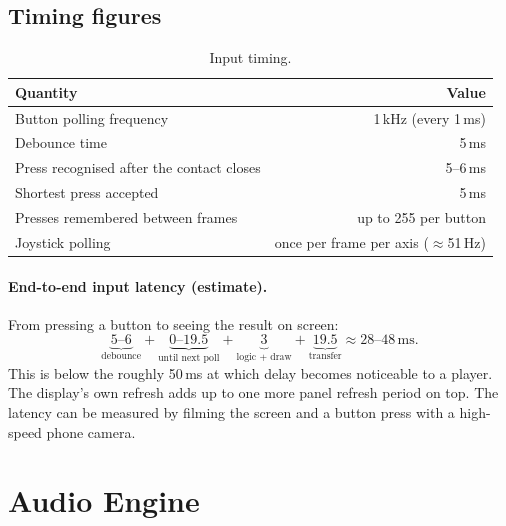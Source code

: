 \documentclass[11pt,a4paper]{article}
\newcommand{\unit}[2]{\ensuremath{#1\,\mathrm{#2}}}
\begin{document}
\subsection{Timing figures}
\begin{table}[H]
\centering
\caption{Input timing.}\label{tab:inputtiming}
\begin{tabular}{lr}
\toprule
\textbf{Quantity} & \textbf{Value} \\
\midrule
Button polling frequency & 1\,kHz (every 1\,ms) \\
Debounce time & 5\,ms \\
Press recognised after the contact closes & 5--6\,ms \\
Shortest press accepted & 5\,ms \\
Presses remembered between frames & up to 255 per button \\
Joystick polling & once per frame per axis ($\approx$51\,Hz) \\
\bottomrule
\end{tabular}
\end{table}

\paragraph{End-to-end input latency (estimate).} From pressing a button to seeing
the result on screen:
\[
  \underbrace{5\text{--}6}_{\text{debounce}} +
  \underbrace{0\text{--}19.5}_{\text{until next poll}} +
  \underbrace{3}_{\text{logic + draw}} +
  \underbrace{19.5}_{\text{transfer}} \approx \unit{28\text{--}48}{ms}.
\]
This is below the roughly 50\,ms at which delay becomes noticeable to a player.
The display's own refresh adds up to one more panel refresh period on top. The
latency can be measured by filming the screen and a button press with a
high-speed phone camera.

\section{Audio Engine}\label{sec:audio}
\end{document}
